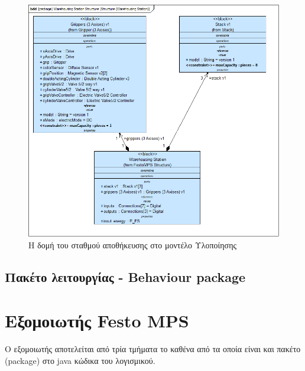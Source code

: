 \documentclass[a4paper,12pt,twoside]{report}
\begin{document}
{\begin{appendices}
				\begin{figure}[hp]
					\centering
					\includegraphics[scale=0.50]{DesignModel_Structure(WarehousingStation).png}
					\caption{Η δομή του σταθμού αποθήκευσης στο μοντέλο Υλοποίησης}
					\label{φωτ:Η δομή του σταθμού αποθήκευσης στο μοντέλο Υλοποίησης}
				\end{figure}	
				
			\FloatBarrier
			\subsection{Πακέτο λειτουργίας - Behaviour package}
			\clearpage

		\FloatBarrier
		\section{Εξομοιωτής Festo MPS\textregistered{}}
		\clearpage
		
			\paragraph{} {O εξομοιωτής αποτελείται από τρία τμήματα το καθένα από τα οποία είναι και πακέτο (package) στο java κώδικα του λογισμικού.
			}
			

\end{appendices}}
\end{document}
